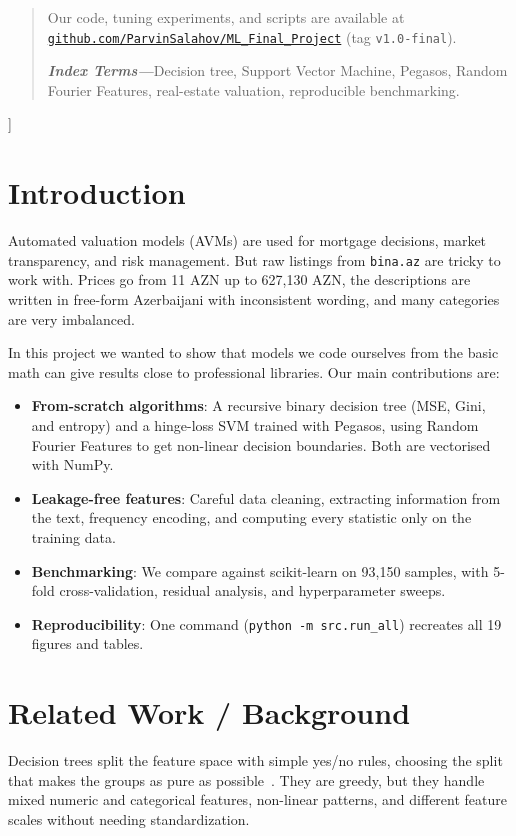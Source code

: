 \documentclass[10pt,twocolumn,a4paper]{article}
\newcommand{\abstractkw}[1]{\noindent\textbf{\textit{#1}}}
\begin{document}
\begin{@twocolumnfalse}
\begin{quote}
      Our code, tuning experiments, and scripts are available at \href{https://github.com/ParvinSalahov/ML_Final_Project}{\texttt{github.com/ParvinSalahov/ML\_Final\_Project}} (tag \texttt{v1.0-final}).
      
      \vspace{0.4em}
      \abstractkw{Index Terms---}Decision tree, Support Vector Machine, Pegasos, Random Fourier Features, real-estate valuation, reproducible benchmarking.
    \end{quote}
    \vspace{0.7em}
    \end{@twocolumnfalse}
  ]

  \section{Introduction}
  Automated valuation models (AVMs) are used for mortgage decisions, market transparency, and risk management. But raw listings from \texttt{bina.az} are tricky to work with. Prices go from 11 AZN up to 627,130 AZN, the descriptions are written in free-form Azerbaijani with inconsistent wording, and many categories are very imbalanced.

  In this project we wanted to show that models we code ourselves from the basic math can give results close to professional libraries. Our main contributions are:
  \begin{itemize}
    \item \textbf{From-scratch algorithms}: A recursive binary decision tree (MSE, Gini, and entropy) and a hinge-loss SVM trained with Pegasos, using Random Fourier Features to get non-linear decision boundaries. Both are vectorised with NumPy.
    \item \textbf{Leakage-free features}: Careful data cleaning, extracting information from the text, frequency encoding, and computing every statistic only on the training data.
    \item \textbf{Benchmarking}: We compare against scikit-learn on 93,150 samples, with 5-fold cross-validation, residual analysis, and hyperparameter sweeps.
    \item \textbf{Reproducibility}: One command (\texttt{python -m src.run\_all}) recreates all 19 figures and tables.
  \end{itemize}

  \section{Related Work / Background}
  Decision trees split the feature space with simple yes/no rules, choosing the split that makes the groups as pure as possible~\cite{breiman1984}. They are greedy, but they handle mixed numeric and categorical features, non-linear patterns, and different feature scales without needing standardization.
\end{document}
